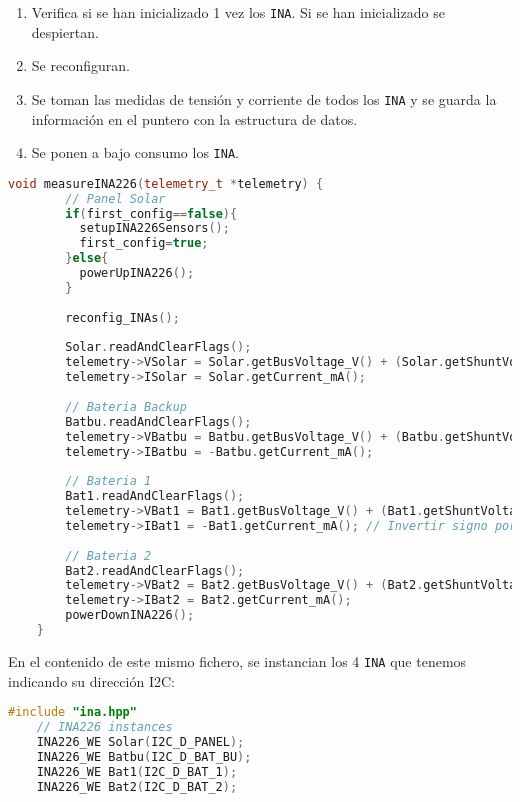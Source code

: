 \begin{enumerate}
    \item Verifica si se han inicializado 1 vez los \texttt{INA}. Si se han inicializado se despiertan.
    \item Se reconfiguran.
    \item Se toman las medidas de tensión y corriente de todos los \texttt{INA} y se guarda la información en el puntero con la estructura de datos.
    \item Se ponen a bajo consumo los \texttt{INA}.
\end{enumerate}

\begin{lstlisting}[captionpos=b, caption={Codigo funcion measureINA226}, language=c++]
    void measureINA226(telemetry_t *telemetry) {
        // Panel Solar
        if(first_config==false){
          setupINA226Sensors();
          first_config=true;
        }else{
          powerUpINA226();  
        }
    
        reconfig_INAs();
        
        Solar.readAndClearFlags();
        telemetry->VSolar = Solar.getBusVoltage_V() + (Solar.getShuntVoltage_mV() / 100);
        telemetry->ISolar = Solar.getCurrent_mA();
    
        // Bateria Backup
        Batbu.readAndClearFlags();
        telemetry->VBatbu = Batbu.getBusVoltage_V() + (Batbu.getShuntVoltage_mV() / 100);
        telemetry->IBatbu = -Batbu.getCurrent_mA();
    
        // Bateria 1
        Bat1.readAndClearFlags();
        telemetry->VBat1 = Bat1.getBusVoltage_V() + (Bat1.getShuntVoltage_mV() / 100);
        telemetry->IBat1 = -Bat1.getCurrent_mA(); // Invertir signo porque esta al reves
    
        // Bateria 2
        Bat2.readAndClearFlags();
        telemetry->VBat2 = Bat2.getBusVoltage_V() + (Bat2.getShuntVoltage_mV() / 100);
        telemetry->IBat2 = Bat2.getCurrent_mA();
        powerDownINA226();
    }
\end{lstlisting}


En el contenido de este mismo fichero, se instancian los 4 \texttt{INA} que tenemos indicando su dirección I2C:

\begin{lstlisting}[captionpos=b, caption={Instancia de las direcciones de los \texttt{INA}.}, language=c++]
    #include "ina.hpp"
    // INA226 instances
    INA226_WE Solar(I2C_D_PANEL);
    INA226_WE Batbu(I2C_D_BAT_BU);
    INA226_WE Bat1(I2C_D_BAT_1);
    INA226_WE Bat2(I2C_D_BAT_2);
    
\end{lstlisting}

